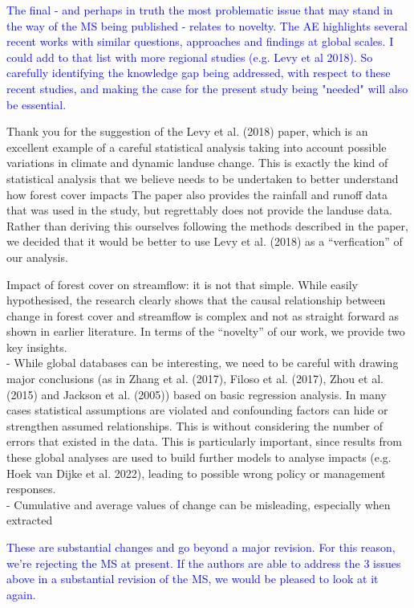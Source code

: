\documentclass[]{elsarticle} %
\begin{document}
\textcolor{blue}{The final - and perhaps in truth the most problematic issue that may stand in the way of the MS being published - relates to novelty.  The AE highlights several recent works with similar questions, approaches and findings at global scales.  I could add to that list with more regional studies (e.g. Levy et al 2018).  So carefully identifying the knowledge gap being addressed, with respect to these recent studies, and making the case for the present study being "needed" will also be essential.}

Thank you for the suggestion of the Levy et al. (2018) paper, which is an excellent example of a careful statistical analysis taking into account possible variations in climate and dynamic landuse change. This is exactly the kind of statistical analysis that we believe needs to be undertaken to better understand how forest cover impacts The paper also provides the rainfall and runoff data that was used in the study, but regrettably does not provide the landuse data. Rather than deriving this ourselves following the methods described in the paper, we decided that it would be better to use Levy et al. (2018) as a ``verfication'' of our analysis.

Impact of forest cover on streamflow: it is not that simple. While easily hypothesised, the research clearly shows that the causal relationship between change in forest cover and streamflow is complex and not as straight forward as shown in earlier literature.
In terms of the ``novelty'' of our work, we provide two key insights.\\
- While global databases can be interesting, we need to be careful with drawing major conclusions (as in Zhang et al. (2017), Filoso et al. (2017), Zhou et al. (2015) and Jackson et al. (2005)) based on basic regression analysis. In many cases statistical assumptions are violated and confounding factors can hide or strengthen assumed relationships. This is without considering the number of errors that existed in the data. This is particularly important, since results from these global analyses are used to build further models to analyse impacts (e.g. Hoek van Dijke et al. 2022), leading to possible wrong policy or management responses.\\
- Cumulative and average values of change can be misleading, especially when extracted

\textcolor{blue}{These are substantial changes and go beyond a major revision.  For this reason, we're rejecting the MS at present.  If the authors are able to address the 3 issues above in a substantial revision of the MS, we would be pleased to look at it again.}
\end{document}
